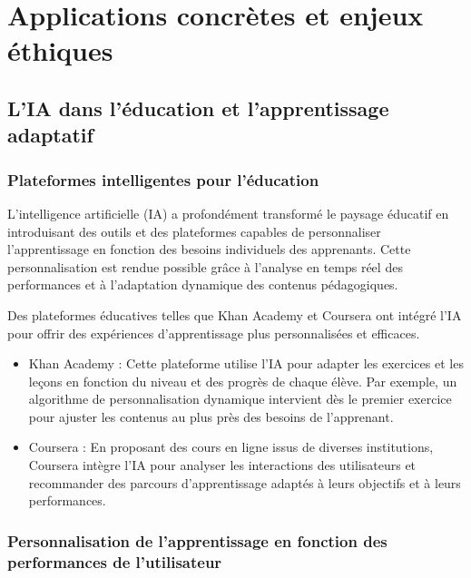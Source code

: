 \documentclass[12pt,a4paper]{report}
\begin{document}
\chapter{Applications concrètes et enjeux éthiques}

\section{L'IA dans l'éducation et l'apprentissage adaptatif}

\subsection{Plateformes intelligentes pour l'éducation}

L'intelligence artificielle (IA) a profondément transformé le paysage éducatif en introduisant des outils et des plateformes capables de personnaliser l'apprentissage en fonction des besoins individuels des apprenants. Cette personnalisation est rendue possible grâce à l'analyse en temps réel des performances et à l'adaptation dynamique des contenus pédagogiques.

Des plateformes éducatives telles que Khan Academy et Coursera ont intégré l'IA pour offrir des expériences d'apprentissage plus personnalisées et efficaces.

\begin{itemize}

    \item Khan Academy : Cette plateforme utilise l'IA pour adapter les exercices et les leçons en fonction du niveau et des progrès de chaque élève. Par exemple, un algorithme de personnalisation dynamique intervient dès le premier exercice pour ajuster les contenus au plus près des besoins de l'apprenant.

    \item Coursera : En proposant des cours en ligne issus de diverses institutions, Coursera intègre l'IA pour analyser les interactions des utilisateurs et recommander des parcours d'apprentissage adaptés à leurs objectifs et à leurs performances.

\end{itemize}

\subsection{Personnalisation de l'apprentissage en fonction des performances de l'utilisateur}
\end{document}
